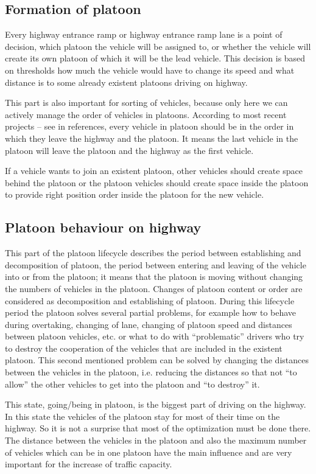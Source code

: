 \subsection{Formation of platoon}

Every highway entrance ramp or highway entrance ramp lane is a point of decision, which platoon the vehicle will be assigned to, or whether the vehicle will create its own platoon of which it will be the lead vehicle. This decision is based on thresholds how much the vehicle would have to change its speed and what distance is to some already existent platoons driving on highway. 

This part is also important for sorting of vehicles, because only here we can actively manage the order of vehicles in platoons. According to most recent projects – see in references, every vehicle in platoon should be in the order in which they leave the highway and the platoon. It means the last vehicle in the platoon will leave the platoon and the highway as the first  vehicle.

If a vehicle wants to join an existent platoon, other vehicles should create space behind the platoon or the platoon vehicles should create space inside the platoon to provide right position order inside the platoon for the new vehicle.

\subsection{Platoon behaviour on highway}

This part of the platoon lifecycle describes the period between establishing and decomposition of platoon, the period between entering and leaving of the vehicle into or from the platoon; it means that the platoon is moving without changing the numbers of vehicles in the platoon. Changes of platoon content or order are considered as decomposition and establishing of platoon. During this lifecycle period the platoon solves several partial problems, for example how to behave during overtaking, changing of lane, changing of platoon speed and distances between platoon vehicles, etc. or what to do with “problematic” drivers who try to destroy the cooperation of the vehicles that are included in the existent platoon. This second mentioned problem can be solved by changing the distances between the vehicles in the platoon, i.e. reducing the distances so that not “to allow” the other vehicles to get into the platoon and “to destroy” it.

This state, going/being in platoon, is the biggest part of driving on the highway. In this state the vehicles of the platoon stay for most of their time on the highway. So it is not a surprise that most of the optimization must be done there. The distance between the vehicles in the platoon and also the maximum number of vehicles which can be in one platoon have the main influence and are very important for the increase of traffic capacity.

